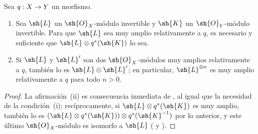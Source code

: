 \documentclass[oneside,10pt]{amsart}
\makeatletter
\newcommand{\ega@arrow}[2]{\mathchoice{#1}{#2}{#2}{#2}}
\renewcommand{\to}{\ega@arrow{\longrightarrow}{\rightarrow}}
\let\EGAOriginalLabel\label
\renewcommand{\label}[1]{\phantomsection\EGAOriginalLabel{#1}}
\makeatother
\begin{document}
\begin{corollary}[4.4.9]
\label{II.4.4.9}
Sea $q:X\to Y$ un morfismo.
\begin{enumerate}
  \item Sea $\sh{L}$ un $\sh{O}_X$-módulo invertible y $\sh{K}$ un $\sh{O}_Y$-módulo invertible.
    Para que $\sh{L}$ sea muy amplio relativamente a $q$, es necesario y suficiente que $\sh{L}\otimes q^*(\sh{K})$ lo sea.
  \item Si $\sh{L}$ y $\sh{L}'$ son dos $\sh{O}_X$-módulos muy amplios relativamente a $q$, también lo es $\sh{L}\otimes\sh{L}'$;
    en particular, $\sh{L}^{\otimes n}$ es muy amplio relativamente a $q$ para todo $n>0$.
\end{enumerate}
\end{corollary}

\begin{proof}
La afirmación~(ii) es consecuencia inmediata de , al igual que la necesidad de la condición~(i);
recíprocamente, si $\sh{L}\otimes q^*(\sh{K})$ es muy amplio, también lo es $(\sh{L}\otimes q^*(\sh{K}))\otimes q^*(\sh{K}^{-1})$ por lo anterior, y este último $\sh{O}_X$-módulo es isomorfo a $\sh{L}$ ( y ).
\end{proof}
\end{document}
